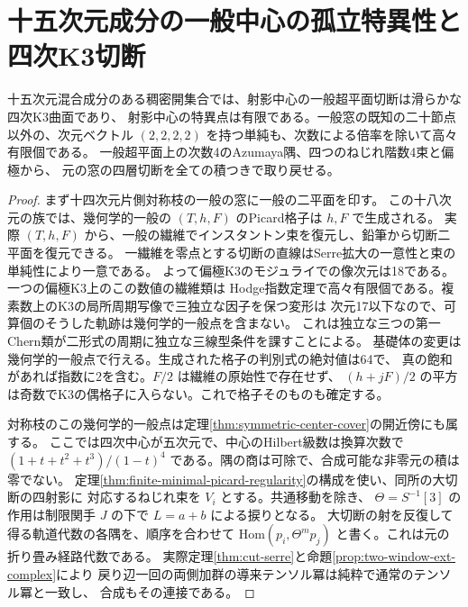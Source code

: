 \section{十五次元成分の一般中心の孤立特異性と四次K3切断}
\label{sec:finite-central-k3-general-section}
\begin{theorem}\label{thm:finite-central-k3-general-section}
十五次元混合成分のある稠密開集合では、射影中心の一般超平面切断は滑らかな四次K3曲面であり、
射影中心の特異点は有限である。一般窓の既知の二十節点以外の、次元ベクトル $(2,2,2,2)$
を持つ単純も、次数による倍率を除いて高々有限個である。
一般超平面上の次数4のAzumaya隅、四つのねじれ階数4束と偏極から、
元の窓の四層切断を全ての積つきで取り戻せる。
\end{theorem}
\begin{proof}
まず十四次元片側対称枝の一般の窓に一般の二平面を印す。
この十八次元の族では、幾何学的一般の $(T,h,F)$ のPicard格子は $h,F$ で生成される。
実際 $(T,h,F)$ から、一般の繊維でインスタントン束を復元し、鉛筆から切断二平面を復元できる。
一繊維を零点とする切断の直線はSerre拡大の一意性と束の単純性により一意である。
よって偏極K3のモジュライでの像次元は18である。一つの偏極K3上のこの数値の繊維類は
Hodge指数定理で高々有限個である。複素数上のK3の局所周期写像で三独立な因子を保つ変形は
次元17以下なので、可算個のそうした軌跡は幾何学的一般点を含まない。
これは独立な三つの第一Chern類が二形式の周期に独立な三線型条件を課すことによる。
基礎体の変更は幾何学的一般点で行える。生成された格子の判別式の絶対値は64で、
真の飽和があれば指数に2を含む。$F/2$ は繊維の原始性で存在せず、
$(h+jF)/2$ の平方は奇数でK3の偶格子に入らない。これで格子そのものも確定する。

対称枝のこの幾何学的一般点は定理\ref{thm:symmetric-center-cover}の開近傍にも属する。
ここでは四次中心が五次元で、中心のHilbert級数は換算次数で
$(1+t+t^2+t^3)/(1-t)^4$ である。隅の商は可除で、合成可能な非零元の積は零でない。
定理\ref{thm:finite-minimal-picard-regularity}の構成を使い、同所の大切断の四射影に
対応するねじれ束を $V_i$ とする。共通移動を除き、
$\Theta=S^{-1}[3]$ の作用は制限関手 $J$ の下で $L=a+b$ による捩りとなる。
大切断の射を反復して得る軌道代数の各隅を、順序を合わせて
$\mathrm{Hom}(p_i,\Theta^m p_j)$ と書く。これは元の折り畳み経路代数である。
実際定理\ref{thm:cut-serre}と命題\ref{prop:two-window-ext-complex}により
戻り辺一回の両側加群の導来テンソル冪は純粋で通常のテンソル冪と一致し、
合成もその連接である。


\end{proof}
